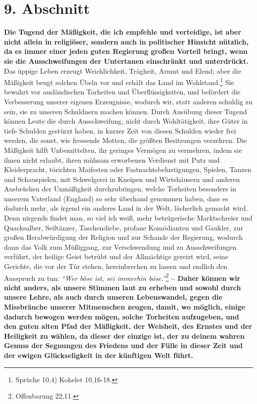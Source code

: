 \section{9. Abschnitt} \label{kap18_ab9}

\label{ref:18_09_gesellschaftlich} \textbf{Die Tugend der Mäßigkeit, die ich
empfehle und verteidige, ist aber nicht
allein in religiöser, sondern auch in politischer Hinsicht
nützlich, da es immer
einer jeden guten Regierung großen Vorteil bringt, wenn sie die
Ausschweifungen der Untertanen einschränkt und unterdrückt.} Das üppige Leben
erzeugt Weichlichkeit, Trägheit, Armut und Elend;
aber die Mäßigkeit beugt
solchen Übeln vor und erhält das Land im Wohlstand.\footnote{Sprüche 10,4)
Kohelet 10,16-18.}
Sie bewahrt vor ausländischen Torheiten und
Überflüssigkeiten, und befördert die Verbesserung unserer eigenen Erzeugnisse,
wodurch wir, statt anderen schuldig zu sein, sie zu unseren Schuldnern machen
können. Durch Ausübung dieser Tugend können Leute die durch Ausschweifung, nicht
durch Wohltätigkeit, ihre Güter in tiefe Schulden gestürzt haben, in kurzer
Zeit von diesen Schulden wieder frei werden, die sonst, wie fressende Motten,
die größten Besitzungen verzehren. Die Mäßigkeit hilft Unbemittelten, ihr
geringes Vermögen zu vermehren, indem sie ihnen nicht erlaubt, ihren mühsam
erworbenen Verdienst mit Putz und Kleiderpracht, törichten Maifesten oder
Fastnachtsbelustigungen, Spielen, Tanzen und Schauspielen, mit
Schwelgerei in
Kneipen und Wirtshäusern und anderen Ausbrüchen der
Unmäßigkeit durchzubringen,
welche Torheiten besonders in unserem Vaterland (England)
so sehr überhand
genommen haben, dass es dadurch mehr, als irgend ein anderes Land in der Welt,
lächerlich gemacht wird. Denn nirgends findet man, so viel ich weiß, mehr
betrügerische Marktschreier und Quacksalber,
Seiltänzer,
Taschendiebe, profane
Komödianten und Gaukler, zur großen Herabwürdigung der
Religion
und zur Schande
der Regierung, wodurch dann das Volk zum Müßiggang, zur
Verschwendung und zu
Ausschweifungen verführt, der heilige Geist betrübt und der Allmächtige gereizt
wird, seine Gerichte, die vor der Tür stehen, hereinbrechen zu lassen und
endlich den Ausspruch zu tun:
\textit{"`Wer böse ist, sei immerhin böse."'}\footnote{Offenbarung 22,11.}
\label{ref:18_09_lautstark} \textbf{-- Daher
können wir nicht anders, als unsere
Stimmen laut zu erheben und sowohl durch unsere Lehre, als auch durch unseren
Lebenswandel, gegen die Missbräuche unserer Mitmenschen zeugen, damit, wo
möglich, einige dadurch bewogen werden mögen, solche Torheiten aufzugeben,
und den guten alten Pfad der Mäßigkeit, der Weisheit, des Ernstes und der
Heiligkeit zu wählen, da dieser der einzige ist, der zu deinem wahren Genuss
der Segnungen des Friedens und der Fülle in dieser Zeit und der ewigen
Glückseligkeit in der künftigen Welt führt.}

